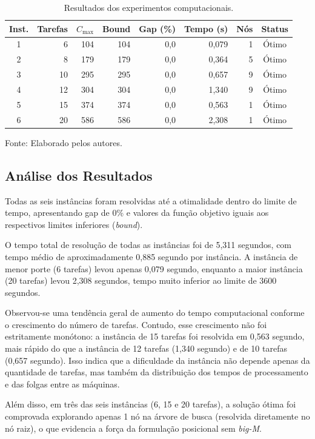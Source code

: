 \documentclass[11pt,a4paper]{article}
\begin{document}
\begin{table}[H]
\centering
\caption{Resultados dos experimentos computacionais.}
\label{tab:resultados_computacionais}
\small
\begin{tabular}{crrrrrrc}
\toprule
Inst. & Tarefas & $C_{\max}$ & Bound & Gap (\%) & Tempo (s) & Nós & Status \\ \midrule
1 & 6  & 104 & 104 & 0{,}0 & 0,079 & 1 & Ótimo \\
2 & 8  & 179 & 179 & 0{,}0 & 0,364 & 5 & Ótimo \\
3 & 10 & 295 & 295 & 0{,}0 & 0,657 & 9 & Ótimo \\
4 & 12 & 304 & 304 & 0{,}0 & 1,340 & 9 & Ótimo \\
5 & 15 & 374 & 374 & 0{,}0 & 0,563 & 1 & Ótimo \\
6 & 20 & 586 & 586 & 0{,}0 & 2,308 & 1 & Ótimo \\ \bottomrule
\end{tabular}
\smallskip

\footnotesize Fonte: Elaborado pelos autores.
\end{table}

\subsection{Análise dos Resultados}
Todas as seis instâncias foram resolvidas até a otimalidade dentro do limite de tempo, apresentando gap de 0\% e valores da função objetivo iguais aos respectivos limites inferiores (\textit{bound}).

O tempo total de resolução de todas as instâncias foi de 5,311 segundos, com tempo médio de aproximadamente 0,885 segundo por instância. A instância de menor porte (6 tarefas) levou apenas 0,079 segundo, enquanto a maior instância (20 tarefas) levou 2,308 segundos, tempo muito inferior ao limite de 3600 segundos.

Observou-se uma tendência geral de aumento do tempo computacional conforme o crescimento do número de tarefas. Contudo, esse crescimento não foi estritamente monótono: a instância de 15 tarefas foi resolvida em 0,563 segundo, mais rápido do que a instância de 12 tarefas (1,340 segundo) e de 10 tarefas (0,657 segundo). Isso indica que a dificuldade da instância não depende apenas da quantidade de tarefas, mas também da distribuição dos tempos de processamento e das folgas entre as máquinas.

Além disso, em três das seis instâncias (6, 15 e 20 tarefas), a solução ótima foi comprovada explorando apenas 1 nó na árvore de busca (resolvida diretamente no nó raiz), o que evidencia a força da formulação posicional sem \textit{big-M}.







\end{document}
